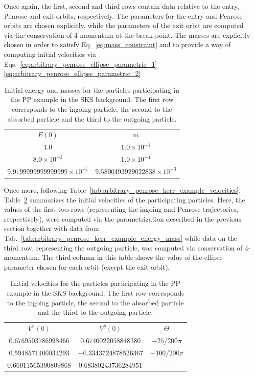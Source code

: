 Once again, the first, second and third rows contain data relative to the entry, Penrose and exit orbits, respectively. The parameters for the entry and Penrose orbits are chosen explicitly, while the parameters of the exit orbit are computed via the conservation of 4-momentum at the break-point. The masses are explicitly chosen in order to satisfy Eq.~\eqref{eq:mass_constraint} and to provide a way of computing initial velocities via Eqs.~\eqref{eq:arbitrary_penrose_ellipse_parametric_1}-\eqref{eq:arbitrary_penrose_ellipse_parametric_2}
%
\begin{table}[]
  \centering
  \begin{tabular}{cc}
    \hline\hline
    $E(0)$                              & $m$                                 \\
    $1.0$                               & $1.0 \times 10^{-1}$                \\
    $8.0 \times 10^{-3}$                & $1.0 \times 10^{-4}$                \\
    $9.9199999999999999 \times 10^{-1}$ & $9.5800493929022838 \times 10^{-3}$ \\ \hline\hline
  \end{tabular}
  \caption{Initial energy and masses for the particles participating in the \ac{PP} example in the \ac{SKS} background. The first row corresponds to the ingoing particle, the second to the absorbed particle and the third to the outgoing particle.}
  \label{tab:arbitrary_penrose_sks_example_energy_mass}
\end{table}

Once more, following Table~\ref{tab:arbitrary_penrose_kerr_example_velocities}, Table~\ref{tab:arbitrary_penrose_sks_example_velocities} summarizes the initial velocities of the participating particles. Here, the values of the first two rows (representing the ingoing and Penrose trajectories, respectively), were computed via the parametrization described in the previous section together with data from Tab.~\ref{tab:arbitrary_penrose_kerr_example_energy_mass} while data on the third row, representing the outgoing particle, was computed via conservation of 4-momentum. The third column in this table shows the value of the ellipse parameter chosen for each orbit (except the exit orbit).
%
\begin{table}[]
  \centering
  \begin{tabular}{ccc}
    \hline\hline
    $V^x(0)$              & $V^y(0)$              & $\Theta$       \\
    $0.6769503786998466$  & $0.6740022058848380$  & $-25/200 \pi$  \\
    $0.5948571400034293$  & $-0.3343724878526367$ & $-100/200 \pi$ \\
    $0.66011565390809868$ & $0.68380243736284951$ & ---            \\ \hline\hline
  \end{tabular}
  \caption{Initial velocities for the particles participating in the \ac{PP} example in the \ac{SKS} background. The first row corresponds to the ingoing particle, the second to the absorbed particle and the third to the outgoing particle.}
  \label{tab:arbitrary_penrose_sks_example_velocities}
\end{table}

